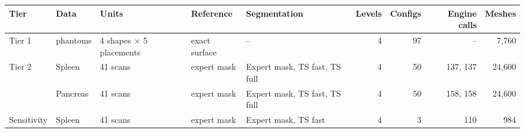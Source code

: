 \begin{tabular}{lllllrrrr}
\toprule
Tier & Data & Units & Reference & Segmentation & Levels & Configs & Engine calls & Meshes \\
\midrule
Tier 1 & phantoms & 4 shapes $\times$ 5 placements & exact surface & -- & 4 & 97 & -- & 7,760 \\
Tier 2 & Spleen & 41 scans & expert mask & Expert mask, TS fast, TS full & 4 & 50 & 137, 137 & 24,600 \\
 & Pancreas & 41 scans & expert mask & Expert mask, TS fast, TS full & 4 & 50 & 158, 158 & 24,600 \\
Sensitivity & Spleen & 41 scans & expert mask & Expert mask, TS fast & 4 & 3 & 110 & 984 \\
\bottomrule
\end{tabular}

